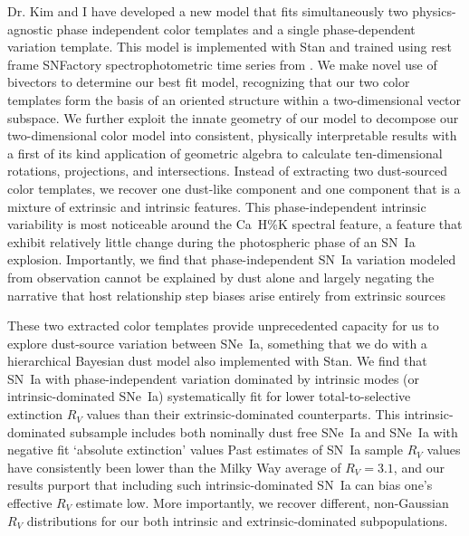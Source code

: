 \documentclass[modern]{aastex631}
\begin{document}
Dr. Kim and I have developed a new model that fits simultaneously two physics-agnostic phase independent color templates and a single phase-dependent variation template. 
This model is implemented with Stan \citep{Stan} and trained using rest frame SNFactory spectrophotometric time series from \citep{Aldering2002}. 
We make novel use of bivectors to determine our best fit model, recognizing that our two color templates form the basis of an oriented structure within a two-dimensional vector subspace. 
We further exploit the innate geometry of our model to decompose our two-dimensional color model into consistent, physically interpretable results with a first of its kind application of geometric algebra to calculate ten-dimensional rotations, projections, and intersections. 
Instead of extracting two dust-sourced color templates, we recover one dust-like component and one component that is a mixture of extrinsic and intrinsic features. 
This phase-independent intrinsic variability is most noticeable around the Ca~H\%K spectral feature, a feature that exhibit relatively little change during the photospheric phase of an SN~Ia explosion. 
Importantly, we find that phase-independent SN~Ia variation modeled from observation cannot be explained by dust alone and largely negating the narrative that host relationship step biases arise entirely from extrinsic sources \citep{Brout2019,Popovic2021}

These two extracted color templates provide unprecedented capacity for us to explore dust-source variation between SNe~Ia, something that we do with a hierarchical Bayesian dust model also implemented with Stan. 
We find that SN~Ia with phase-independent variation dominated by intrinsic modes (or intrinsic-dominated SNe~Ia) systematically fit for lower total-to-selective extinction $R_V$ values than their extrinsic-dominated counterparts. 
This intrinsic-dominated subsample includes both nominally dust free SNe~Ia and SNe~Ia with negative fit `absolute extinction' values
Past estimates of SN~Ia sample $R_V$ values have consistently been lower than the Milky Way average of $R_V=3.1$, and our results purport that including such intrinsic-dominated SN~Ia can bias one's effective $R_V$ estimate low. 
More importantly, we recover different, non-Gaussian $R_V$ distributions for our both intrinsic and extrinsic-dominated subpopulations. 
\end{document}
